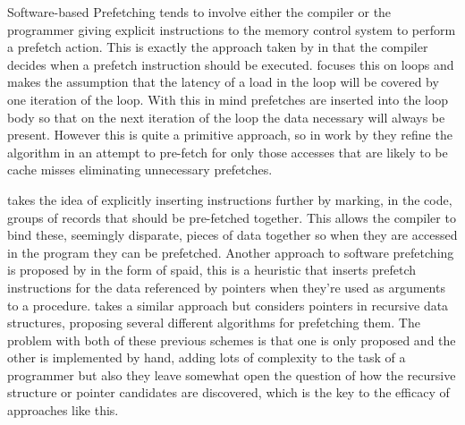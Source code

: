 Software-based Prefetching tends to involve either the compiler or the programmer giving explicit instructions to the memory control system to perform a prefetch action. This is exactly the approach taken by \citet{callahanSoftwarePrefetching1991} in that the compiler decides when a prefetch instruction should be executed. \citeauthor{callahanSoftwarePrefetching1991} focuses this on loops and makes the assumption that the latency of a load in the loop will be covered by one iteration of the loop. With this in mind prefetches are inserted into the loop body so that on the next iteration of the loop the data necessary will always be present. However this is quite a primitive approach, so in work by \citet{mowryDesignEvaluationCompiler1992} they refine the algorithm in an attempt to pre-fetch for only those accesses that are likely to be cache misses eliminating unnecessary prefetches.  

\citet{zhangSpeedingIrregularApplications1995} takes the idea of explicitly inserting instructions further by marking, in the code, groups of records that should be pre-fetched together. This allows the compiler to bind these, seemingly disparate, pieces of data together so when they are accessed in the program they can be prefetched. Another approach to software prefetching is proposed by \citet{lipastiSPAIDSoftwarePrefetching1995} in the form of \gls{spaid}, this is a heuristic that inserts prefetch instructions for the data referenced by pointers when they're used as arguments to a procedure. \citet{lukCompilerbasedPrefetchingRecursive1996} takes a similar approach but considers pointers in recursive data structures, proposing several different algorithms for prefetching them. The problem with both of these previous schemes is that one is only proposed and the other is implemented by hand, adding lots of complexity to the task of a programmer but also they leave somewhat open the question of how the recursive structure or pointer candidates are discovered, which is the key to the efficacy of approaches like this.

